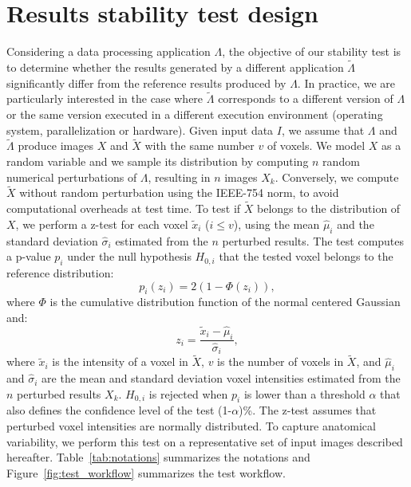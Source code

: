 \documentclass[lettersize,journal]{IEEEtran}
\begin{document}
\section{Results stability test design}

Considering a data processing application $\Lambda$, the objective of our stability test is to determine whether the results generated by a different application $\tilde \Lambda$ significantly differ from the reference results produced by $\Lambda$. In practice, we are particularly interested in the case where $\tilde \Lambda$ corresponds to a different version of $\Lambda$ or the same version executed in a different execution environment (operating system, parallelization or hardware). Given input data $I$, we assume that $\Lambda$ and $\tilde \Lambda$ produce images $X$ and $\tilde X$ with the same number $v$ of voxels. We model $X$ as a random variable and we sample its distribution by computing $n$ random numerical perturbations of $\Lambda$, resulting in $n$ images $X_k$. Conversely, we compute $\tilde X$ without random perturbation using the IEEE-754 norm, to avoid computational overheads at test time. To test if $\tilde X$ belongs to the distribution of $X$, we perform a z-test for each voxel $\tilde x_i$ ($i\leq v$), using the mean $\hat \mu_i$ and the standard deviation $\hat \sigma_i$ estimated from the $n$ perturbed results. The test computes a p-value $p_i$ under the null hypothesis $H_{0,i}$ that the tested voxel belongs to the reference distribution:
\begin{equation} \label{eq:pval}
  p_i(z_i) = 2 \left(1-\Phi(z_i)\right),
\end{equation}
where $\Phi$ is the cumulative distribution function of the normal centered
Gaussian and:
\begin{equation*}
  z_i = \frac{\tilde x_i-\hat \mu_i}{\hat \sigma_i},
\end{equation*}
where $\tilde x_i$ is the intensity of a voxel in $\tilde X$, $v$ is the number of voxels in $\tilde X$, and $\hat \mu_i$ and $\hat \sigma_i$ are the mean and standard deviation voxel intensities estimated from the $n$ perturbed results $X_k$. $H_{0,i}$ is rejected when $p_i$ is lower than a threshold $\alpha$ that also defines the confidence level of the test (1-$\alpha$)\%. The z-test assumes that perturbed voxel intensities are normally distributed. To capture anatomical variability, we perform this test on a representative set of input images described hereafter. Table~\ref{tab:notations} summarizes the notations and Figure~\ref{fig:test_workflow} summarizes the test workflow.
\end{document}
